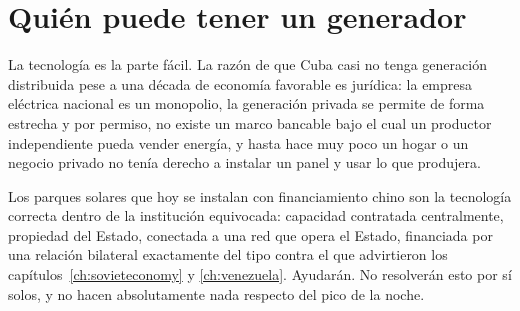 \section{Quién puede tener un generador}

La tecnología es la parte fácil. La razón de que Cuba casi no tenga generación
distribuida pese a una década de economía favorable es jurídica: la empresa eléctrica
nacional es un monopolio, la generación privada se permite de forma estrecha y por
permiso, no existe un marco bancable bajo el cual un productor independiente pueda vender
energía, y hasta hace muy poco un hogar o un negocio privado no tenía derecho a instalar
un panel y usar lo que produjera.

Los parques solares que hoy se instalan con financiamiento chino son la tecnología
correcta dentro de la institución equivocada: capacidad contratada centralmente, propiedad
del Estado, conectada a una red que opera el Estado, financiada por una relación bilateral
exactamente del tipo contra el que advirtieron los capítulos~\ref{ch:sovieteconomy} y
\ref{ch:venezuela}. Ayudarán. No resolverán esto por sí solos, y no hacen absolutamente
nada respecto del pico de la noche.

